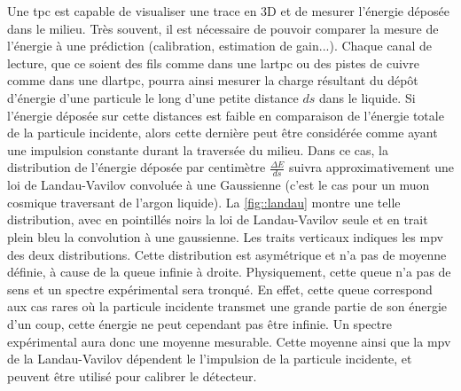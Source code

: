         Une \gls{tpc} est capable de visualiser une trace en 3D et de mesurer l'énergie déposée dans le milieu. Très souvent, il est nécessaire de pouvoir comparer la mesure de l'énergie à une prédiction (calibration, estimation de gain...). Chaque canal de lecture, que ce soient des fils comme dans une \gls{lartpc} ou des pistes de cuivre comme dans une \gls{dlartpc}, pourra ainsi mesurer la charge résultant du dépôt d'énergie d'une particule le long d'une petite distance $ds$ dans le liquide. Si l'énergie déposée sur cette distances est faible en comparaison de l'énergie totale de la particule incidente, alors cette dernière peut être considérée comme ayant une impulsion constante durant la traversée du milieu. Dans ce cas, la distribution de l'énergie déposée par centimètre $\frac{\Delta E}{ds}$ suivra approximativement une loi de Landau-Vavilov convoluée à une Gaussienne\cite{Bichsel2006} (c'est le cas pour un muon cosmique traversant de l'argon liquide). La \autoref{fig::landau} montre une telle distribution, avec en pointillés noirs la loi de Landau-Vavilov seule et en trait plein bleu la convolution à une gaussienne. Les traits verticaux indiques les \gls{mpv} des deux distributions. Cette distribution est asymétrique et n'a pas de moyenne définie, à cause de la queue infinie à droite. Physiquement, cette queue n'a pas de sens et un spectre expérimental sera tronqué. En effet, cette queue correspond aux cas rares où la particule incidente transmet une grande partie de son énergie d'un coup, cette énergie ne peut cependant pas être infinie. Un spectre expérimental aura donc une moyenne mesurable. Cette moyenne ainsi que la \gls{mpv} de la Landau-Vavilov dépendent le l'impulsion de la particule incidente, et peuvent être utilisé pour calibrer le détecteur.%

